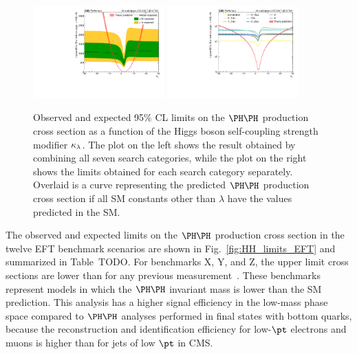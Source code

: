\begin{figure}
  \centering
  \includegraphics[width=0.45\textwidth]{figures/klscan.pdf}
  \hspace{0.05\textwidth}
  \includegraphics[width=0.45\textwidth]{figures/klMultiscan.pdf}
  \caption{
    Observed and expected 95\% CL limits on the $\HH$ production cross section as
    a function of the Higgs boson self-coupling strength modifier $\kappa_{\lambda}$.
    The plot on the left shows the result obtained by combining all seven search categories,
    while the plot on the right shows the limits obtained for each search category separately.  Overlaid is a curve representing the
    predicted $\HH$ production cross section if all SM constants other than
    $\lambda$ have the values predicted in the SM.
  }
  \label{fig:HH_limits_kLambda}
\end{figure}

The observed and expected limits on the $\HH$ production cross section in the
twelve EFT benchmark scenarios are shown in Fig.~\ref{fig:HH_limits_EFT}
and summarized in Table~TODO.
For benchmarks X, Y, and Z, the upper limit cross sections are lower
than for any previous measurement~\cite{Sirunyan:2745738}.
These benchmarks represent models in which the $\HH$ invariant mass is
lower than the SM prediction.  This analysis has a higher signal efficiency
in the low-mass phase space compared to $\HH$ analyses performed in final states with bottom quarks,
because the reconstruction and identification efficiency for low-$\pt$ electrons and muons is higher than for jets of low $\pt$ in CMS.

